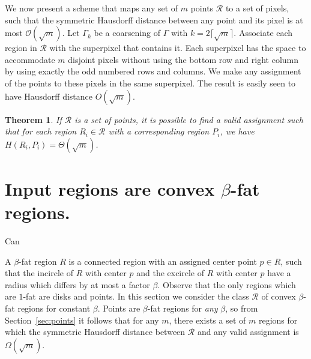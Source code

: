 \documentclass[a4paper, 11pt]{article}
\newtheorem{theorem}{Theorem}
\begin{document}
We now present a scheme that maps any set of $m$ points $\mathcal{R}$ to a set of pixels, such that the symmetric Hausdorff distance between any point and its pixel is at most $\mathcal{O}(\sqrt{m})$. Let $\Gamma_k$ be a coarsening of $\Gamma$ with $k=2\lceil \sqrt{m}\rceil$. Associate each region in
$\mathcal{R}$ with the superpixel that contains it. Each superpixel has the space to accommodate $m$ disjoint pixels without using the bottom row and right column by using exactly the odd numbered rows and columns. We make any assignment of the points to these pixels in the same superpixel. The result is easily seen to have Hausdorff distance $O(\sqrt{m})$.


\begin{theorem}
If $\mathcal{R}$ is a set of points, it is possible to find a valid assignment such that for each region $R_i \in \mathcal{R}$ with a corresponding region $P_i$, we have $H(R_i, P_i) = \Theta(\sqrt{m})$.
\end{theorem}

\section{Input regions are convex $\beta$-fat regions.}Can
\label{sec:fat}

A $\beta$-fat region $R$ is a connected region with an assigned center point $p \in R$, such that the incircle of $R$ with center $p$ and the excircle of $R$ with center $p$ have a radius which differs by at most a factor $\beta$. Observe that the only regions which are $1$-fat are disks and points. In this section we consider the class $\mathcal{R}$ of convex $\beta$-fat regions for constant $\beta$. Points are $\beta$-fat regions for \emph{any} $\beta$, so from Section~\ref{sec:points} it follows that for any $m$, there exists a set of $m$ regions for which the symmetric Hausdorff distance between $\mathcal{R}$ and any valid assignment is $\Omega(\sqrt{m})$.
\end{document}
